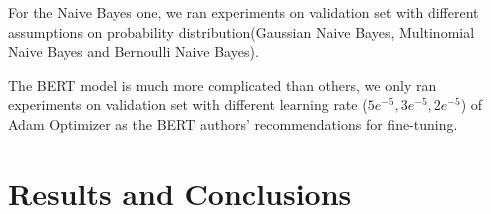 \documentclass[10pt]{article}
\begin{document}
For the Naive Bayes one, we ran experiments on validation set with different assumptions on probability distribution(Gaussian Naive Bayes, Multinomial Naive Bayes and Bernoulli Naive Bayes).

The BERT model is much more complicated than others, we only ran experiments on validation set with different learning rate ($ 5e^{-5}, 3e^{-5}, 2e^{-5}$) of Adam Optimizer as the BERT authors' recommendations for fine-tuning.
\section{Results and Conclusions}

%

\end{document}
